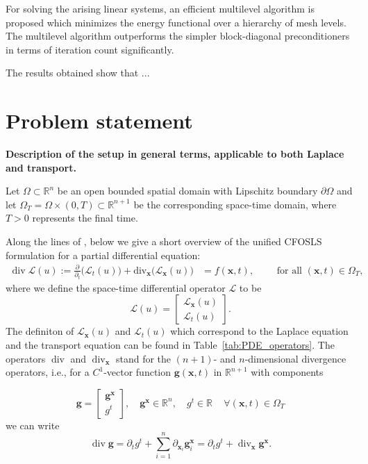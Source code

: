 \documentclass[a4paper,12pt]{amsart}
\numberwithin{equation}{section}
\renewcommand{\div}{\operatorname{div}}
\renewcommand{\L}{{\mathcal L}}
\def\XVec#1{{\mathbf #1}}
\def\Xx{\XVec{x}}
\begin{document}
For solving the arising linear systems, an efficient multilevel algorithm is proposed which minimizes the energy functional over a hierarchy of mesh levels. The multilevel algorithm outperforms the simpler block-diagonal preconditioners in terms of iteration count significantly.

The results obtained show that ...

\section{Problem statement}

\textbf{Description of the setup in general terms, applicable to both Laplace and transport.}

\bigskip

Let $\Omega\subset \mathbb{R}^n$ be an open bounded spatial domain with Lipschitz boundary $\partial \Omega$ and let 
$\Omega_{T} = \Omega\times (0,T)\subset \mathbb{R}^{n+1}$ be the corresponding space-time domain,  where $T>0$ represents the final time.  

Along the lines of \cite{our_paper_cfosls}, below we give a short overview of the unified CFOSLS formulation for a partial differential equation:
\begin{align} \label{Problem}
\div \L(u) := \frac{\partial}{\partial_t} \big(\L_t(u) \big)+ \mathrm{div}_\Xx \big( \L_\Xx (u)\big)& = f(\Xx, t), \qquad \text{ for all } (\Xx,t) \in \Omega_T,
\end{align}
where we define the space-time differential operator $\L$ to be
\[
\L(u) =  \begin{bmatrix} \L_\Xx(u) \\ \L_t(u) \end{bmatrix}.
\]
The definiton of $\L_\Xx(u)$ and $\L_t(u)$ which correspond to the Laplace equation and the transport equation can be found  in Table~\ref{tab:PDE_operators}.
The operators $\div$ and $\div_\Xx$ stand for the $(n+1)$- and $n$-dimensional divergence operators, i.e., for a $C^1$-vector function $\mathbf{g}(\Xx,t)$ in $\mathbb{R}^{n+1}$ with components

$$
\mathbf{g} =  \begin{bmatrix} \mathbf{g}^\Xx 
\\ g^t \end{bmatrix}, \quad 
\mathbf{g}^\Xx \in \mathbb{R}^{n}, \quad g^t \in \mathbb{R} \quad \, \forall (\Xx,t) \in \Omega_T
$$
we can write
$$
\div \mathbf{g} = \partial_t g^t + \sum_{i = 1}^{n} \partial_{\Xx_i} \mathbf{g}^{\Xx}_i = \partial_t g^t + \div_\Xx \mathbf{g}^{\Xx}.
$$
\end{document}
